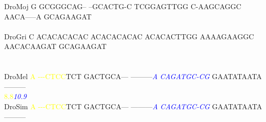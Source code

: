 \documentclass[11pt,twoside,reqno,a4paper]{article}
\begin{document}
{DroMoj	G	GCGGGCAG--	--GCACTG-C	TCGGAGTTGG	C-AAGCAGGC	AACA-----A	GCAGAAGAT\\
\hspace*{7\charwidth}\hspace*{1\charwidth}\hspace*{1\charwidth}\hspace*{1\charwidth}\hspace*{1\charwidth}\hspace*{1\charwidth}\hspace*{1\charwidth}\\
DroGri	C	ACACACACAC	ACACACACAC	ACACACTTGG	AAAAGAAGGC	AACACAAGAT	GCAGAAGAT\\
\hspace*{7\charwidth}\hspace*{1\charwidth}\hspace*{1\charwidth}\hspace*{1\charwidth}\hspace*{1\charwidth}\hspace*{1\charwidth}\hspace*{1\charwidth}\\
\\
DroMel	\textcolor{Yellow}{A}	\textcolor{Yellow}{-}\textcolor{Yellow}{-}\textcolor{Yellow}{-}\textcolor{Yellow}{C}\textcolor{Yellow}{T}\textcolor{Yellow}{C}\textcolor{Yellow}{C}TCT	GACTGCA---	---------\textit{\textcolor{Blue}{A}}	\textit{\textcolor{Blue}{C}}\textit{\textcolor{Blue}{A}}\textit{\textcolor{Blue}{G}}\textit{\textcolor{Blue}{A}}\textit{\textcolor{Blue}{T}}\textit{\textcolor{Blue}{G}}\textit{\textcolor{Blue}{C}}\textit{\textcolor{Blue}{-}}\textit{\textcolor{Blue}{C}}\textit{\textcolor{Blue}{G}}	GAATATAATA	---------\\
\hspace*{7\charwidth}\hspace*{0\charwidth}\textcolor{Yellow}{8.8}\hspace*{1\charwidth}\hspace*{1\charwidth}\hspace*{1\charwidth}\hspace*{27\charwidth}\textit{\textcolor{Blue}{10.9}}\hspace*{1\charwidth}\hspace*{1\charwidth}\hspace*{1\charwidth}\\
DroSim	\textcolor{Yellow}{A}	\textcolor{Yellow}{-}\textcolor{Yellow}{-}\textcolor{Yellow}{-}\textcolor{Yellow}{C}\textcolor{Yellow}{T}\textcolor{Yellow}{C}\textcolor{Yellow}{C}TCT	GACTGCA---	---------\textit{\textcolor{Blue}{A}}	\textit{\textcolor{Blue}{C}}\textit{\textcolor{Blue}{A}}\textit{\textcolor{Blue}{G}}\textit{\textcolor{Blue}{A}}\textit{\textcolor{Blue}{T}}\textit{\textcolor{Blue}{G}}\textit{\textcolor{Blue}{C}}\textit{\textcolor{Blue}{-}}\textit{\textcolor{Blue}{C}}\textit{\textcolor{Blue}{G}}	GAATATAATA	---------\\
}
\end{document}
